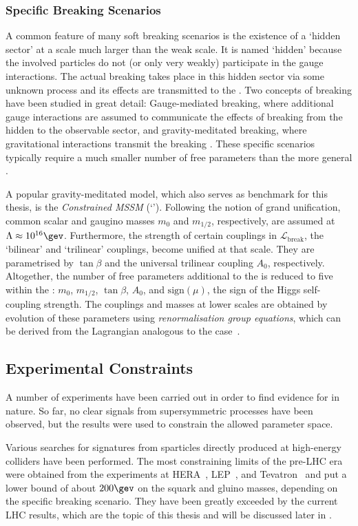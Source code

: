 \subsubsection{Specific Breaking Scenarios}
A common feature of many soft \susy breaking scenarios is the existence of a `hidden sector' at a scale much larger than the weak scale.
It is named `hidden' because the involved particles do not (or only very weakly) participate in the \sm gauge interactions.
The actual \susy breaking takes place in this hidden sector via some unknown process and its effects are transmitted to the \mssm.
Two concepts of \susy breaking have been studied in great detail:
Gauge-mediated breaking, where additional gauge interactions are assumed to communicate the effects of \susy breaking from the hidden to the observable sector, and gravity-meditated breaking, where gravitational interactions transmit the breaking \addref.
These specific scenarios typically require a much smaller number of free parameters than the more general \mssm.

A popular gravity-meditated model, which also serves as benchmark for this thesis, is the \emph{Constrained MSSM} (`\cmssm')\addref.
Following the notion of grand unification, common scalar and gaugino masses $m_{0}$ and $m_{1/2}$, respectively, are assumed at \mbox{$\Lambda\approx10^{16}\gev$}.
Furthermore, the strength of certain couplings in $\mathcal{L}_{\text{break}}$, the `bilinear' and `trilinear' couplings, become unified at that scale.
They are parametrised by $\tan\beta$ and the universal trilinear coupling $A_{0}$, respectively.
Altogether, the number of free parameters additional to the \sm is reduced to five within the \cmssm: $m_{0}$, $m_{1/2}$, $\tan\beta$, $A_{0}$, and $\text{sign}(\mu)$, the sign of the Higgs self-coupling strength.
The couplings and masses at lower scales are obtained by evolution of these parameters using \emph{renormalisation group equations}, which can be derived from the Lagrangian analogous to the \sm case~\cite{Delamotte:2002vw}.


\subsection{Experimental Constraints}
A number of experiments have been carried out in order to find evidence for \susy in nature.
So far, no clear signals from supersymmetric processes have been observed, but the results were used to constrain the allowed \mssm parameter space.

Various searches for signatures from sparticles directly produced at high-energy colliders have been performed.
The most constraining limits of the pre-LHC era were obtained from the experiments at HERA~\cite{Aid:1996es,Zeus:2006je}, LEP~\cite{ALEPHSUSY,DELPHISUSY,L3SUSY,OPALSUSY,LEPLimits}, and Tevatron~\cite{CDFLimits,D0Limits,Abazov200934} and put a lower bound of about $200\gev$ \tobechecked on the squark and gluino masses, depending on the specific breaking scenario.
They have been greatly exceeded by the current LHC results, which are the topic of this thesis and will be discussed later in \qsec{}.

